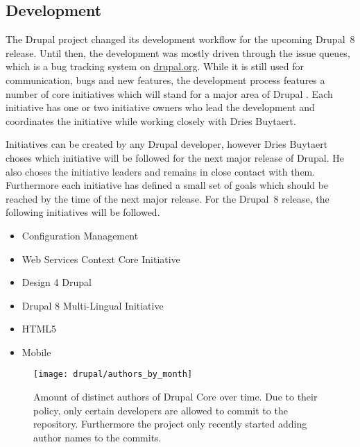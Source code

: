 
\subsection{Development} %

The Drupal project changed its development workflow for the upcoming Drupal~8
release. Until then, the development was mostly driven through the issue
queues, which is a bug tracking system on \url{drupal.org}. While it is still
used for communication, bugs and new features, the development process features
a number of core initiatives which will stand for a major area of Drupal
\cite{DrupalInitiatives}. Each initiative has one or two initiative owners who
lead the development and coordinates the initiative while working closely with
Dries Buytaert.

Initiatives can be created by any Drupal developer, however Dries Buytaert
choses which initiative will be followed for the next major release of Drupal.
He also choses the initiative leaders and remains in close contact with them.
Furthermore each initiative has defined a small set of goals which should be
reached by the time of the next major release. For the Drupal~8 release, the
following initiatives will be followed.

\begin{itemize}
  \item Configuration Management
  \item Web Services Context Core Initiative
  \item Design 4 Drupal
  \item Drupal 8 Multi-Lingual Initiative
  \item HTML5
  \item Mobile
\end{itemize}

\begin{figure}[htbp]
  \centering
  \texttt{[image: drupal/authors\_by\_month]}
  \caption[Authors by Month, Drupal]
  {Amount of distinct authors of Drupal Core over time. Due to their
  policy, only certain developers are allowed to commit to the repository.
  Furthermore the project only recently started adding author names to the
  commits.}
\end{figure}



